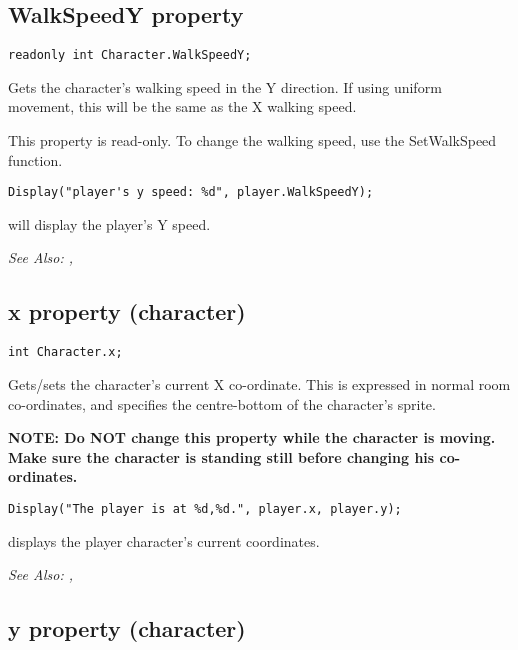 \subsection{WalkSpeedY property}\label{Character.WalkSpeedY}%

\begin{verbatim}
readonly int Character.WalkSpeedY;
\end{verbatim}

Gets the character's walking speed in the Y direction. If using uniform movement,
this will be the same as the X walking speed.

This property is read-only. To change the walking speed, use the SetWalkSpeed function.

\begin{verbatim}
Display("player's y speed: %d", player.WalkSpeedY);
\end{verbatim}
will display the player's Y speed.

\it{See Also:} ,


\subsection{x property (character)}\label{Character.x}%

\begin{verbatim}
int Character.x;
\end{verbatim}

Gets/sets the character's current X co-ordinate. This is expressed in normal room
co-ordinates, and specifies the centre-bottom of the character's sprite.

\bf{NOTE:} Do \bf{NOT} change this property while the character is moving. Make
sure the character is standing still before changing his co-ordinates.

\begin{verbatim}
Display("The player is at %d,%d.", player.x, player.y);
\end{verbatim}
displays the player character's current coordinates.

\it{See Also:} ,


\subsection{y property (character)}\label{Character.y}%

